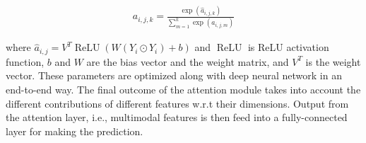  \vspace{-6mm}
 \begin{align}
    a_{i, j, k}=\frac{\exp \left(\hat{a}_{i, j, k}\right)}{\sum_{m=1}^{k} \exp \left(a_{i, j, m}\right)}
\end{align}

\hspace*{3.5mm} where $\hat{a}_{i,j}=V^{T} \operatorname{ReLU}\left(W\left(Y_{i} \odot Y_{i}\right)+b\right)$ and $\operatorname{ReLU}$ is ReLU activation function, $b$ and $W$ are the bias vector and the weight matrix, and $V^{T}$ is the weight vector. These parameters are optimized along with deep neural network in an end-to-end way. The final outcome of the attention module takes into account the different contributions of different features w.r.t their dimensions. Output from the attention layer, i.e., multimodal features is then feed into a fully-connected layer for making the prediction. 

